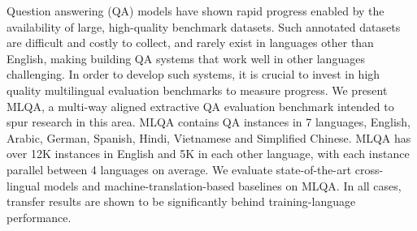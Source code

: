 Question answering (QA) models have shown rapid progress enabled by the availability of large, high-quality benchmark datasets. Such annotated datasets are difficult and costly to collect, and rarely exist in languages other than English, making building QA systems that work well in other languages challenging. In order to develop such systems, it is crucial to invest in high quality multilingual evaluation benchmarks to measure progress. We present MLQA, a multi-way aligned extractive QA evaluation benchmark intended to spur research in this area. MLQA contains QA instances in 7 languages, English, Arabic, German, Spanish, Hindi, Vietnamese and Simplified Chinese. MLQA has over 12K instances in English and 5K in each other language, with each instance parallel between 4 languages on average. We evaluate state-of-the-art cross-lingual models and machine-translation-based baselines on MLQA.  In all cases, transfer results are shown to be significantly behind training-language performance.
